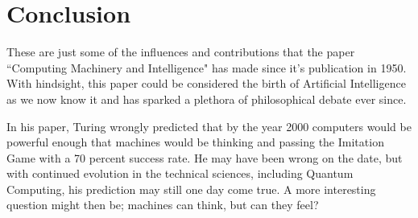\documentclass{scrartcl}
\begin{document}
\section{Conclusion}
These are just some of the influences and contributions that the paper \textquotedblleft Computing Machinery and Intelligence" has made since it's publication in 1950. With hindsight, this paper could be considered the birth of Artificial Intelligence as we now know it and has sparked a plethora of philosophical debate ever since. \par
In his paper, Turing wrongly predicted that by the year 2000 computers would be powerful enough that machines would be thinking and passing the Imitation Game with a 70 percent success rate. He may have been wrong on the date, but with continued evolution in the technical sciences, including Quantum Computing, his prediction may still one day come true. A more interesting question might then be; machines can think, but can they feel?









\end{document}

